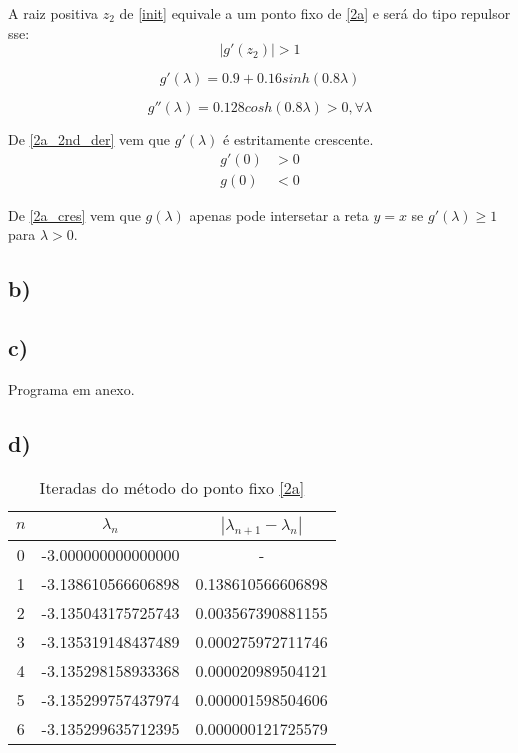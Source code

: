 \documentclass[a4paper, 12pt]{article}
\begin{document}
	\par
	A raiz positiva $z_2$ de \eqref{init} equivale a um ponto fixo de \eqref{2a} e será do tipo repulsor sse:
	$$|g'(z_2)| > 1$$

	\begin{equation}
		g'(\lambda) = 0.9 + 0.16sinh(0.8\lambda)
	\end{equation}

	\begin{equation} \label{2a_2nd_der}
		g''(\lambda) = 0.128cosh(0.8\lambda) > 0, \forall \lambda
	\end{equation}

	\par
	De \eqref{2a_2nd_der} vem que $g'(\lambda)$ é estritamente crescente.
	\begin{equation} \label{2a_cres}
	\begin{split}
		g'(0) &> 0 \\
		g(0) &< 0
	\end{split}
	\end{equation}

	\par
	De \eqref{2a_cres} vem que $g(\lambda)$ apenas pode intersetar a reta $y = x$ se $g'(\lambda) \geqslant 1$ para $\lambda > 0$.

\subsection*{b)}

\subsection*{c)}
	Programa em anexo.

\subsection*{d)}
	\begin{table}[H]
		\setlength{\tabcolsep}{0.5cm} %
		\renewcommand{\arraystretch}{1.5} %
		\centering
		\caption{Iteradas do método do ponto fixo \eqref{2a}}
		\label{2d_table}
		\begin{tabular}{|c|c|c|}
			$n$ & $\lambda _n$ &  $| \lambda _{n+1} - \lambda _n |$ \\\hline
			0& -3.000000000000000 & -  \\
			1& -3.138610566606898 & 0.138610566606898 \\
			2& -3.135043175725743 & 0.003567390881155 \\
			3& -3.135319148437489 & 0.000275972711746 \\
			4& -3.135298158933368 & 0.000020989504121 \\
			5& -3.135299757437974 & 0.000001598504606 \\
			6& -3.135299635712395 & 0.000000121725579 \\
		\end{tabular}
	\end{table}
\end{document}
